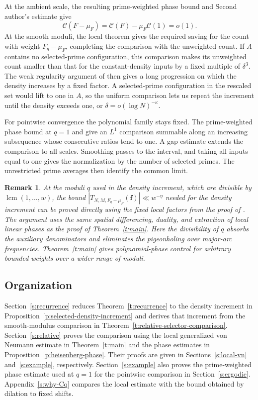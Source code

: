 \documentclass[12pt]{amsart}
\newcommand{\1}{\mathbf 1}
\newtheorem{remark}[theorem]{Remark}
\theoremstyle{definition}
\begin{document}
At the ambient scale, the resulting prime-weighted phase bound
and Second author's estimate give
$$\mathcal C(F-\mu_F)=\mathcal C(F)-\mu_F\mathcal C(1)=o(1).$$
At the smooth moduli, the local theorem gives the required
saving for the count with weight $F_q-\mu_F$, completing the
comparison with the unweighted count. If $A$ contains no
selected-prime configuration, this comparison makes its
unweighted count smaller than that for the constant-density
inputs by a fixed multiple of $\delta^3$. The weak regularity
argument of \cite{KMTT} then gives a long progression on which
the density increases by a fixed factor. A selected-prime
configuration in the rescaled set would lift to one in $A$,
so the uniform comparison lets us repeat the increment until
the density exceeds one, or $\delta=o(\log N)^{-\kappa}$.

For pointwise convergence the polynomial family stays fixed.
The prime-weighted phase bound at $q=1$ and \cite[Theorem~4.1]{Teravainen} give an $L^1$ comparison summable along an increasing subsequence whose consecutive
ratios tend to one.
A gap estimate extends the comparison to all scales. Smoothing
passes to the interval, and taking all inputs equal to one
gives the normalization by the number of selected primes.
The unrestricted prime averages \cite{MirekWanWright} then identify the common limit.

\begin{remark}
At the moduli $q$ used in the density increment, which are divisible
by $\operatorname{lcm}(1,\ldots,w)$, the bound
$|T_{N,M,F_q-\mu_F}(\mathbf f)|\ll w^{-\eta}$ needed for the
density increment can be proved directly using the fixed local
factors from the proof of \cite[Lemma~5.3]{KMTT}. The argument
uses the same spatial differencing, duality, and extraction of
local linear phases as the proof of Theorem~\ref{t:main}.
Here the divisibility of $q$ absorbs the auxiliary denominators
and eliminates the pigeonholing over major-arc frequencies.
Theorem~\ref{t:main} gives polynomial-phase control for arbitrary
bounded weights over a wider range of moduli.
\end{remark}

\subsection{Organization}

Section~\ref{s:recurrence} reduces Theorem~\ref{t:recurrence}
to the density increment in Proposition~\ref{p:selected-density-increment}
and derives that increment from the smooth-modulus comparison
in Theorem~\ref{t:relative-selector-comparison}.
Section~\ref{s:relative} proves the comparison using the local
generalized von Neumann estimate in Theorem~\ref{t:main} and
the phase estimates in Proposition~\ref{p:heisenberg-phase}.
Their proofs are given in Sections~\ref{s:local-vn}
and~\ref{s:example}, respectively. Section~\ref{s:example}
also proves the prime-weighted phase estimate used at $q=1$
for the pointwise comparison in Section~\ref{s:ergodic}.
Appendix~\ref{s:why-Cq} compares the local estimate with the
bound obtained by dilation to fixed shifts.
\end{document}
